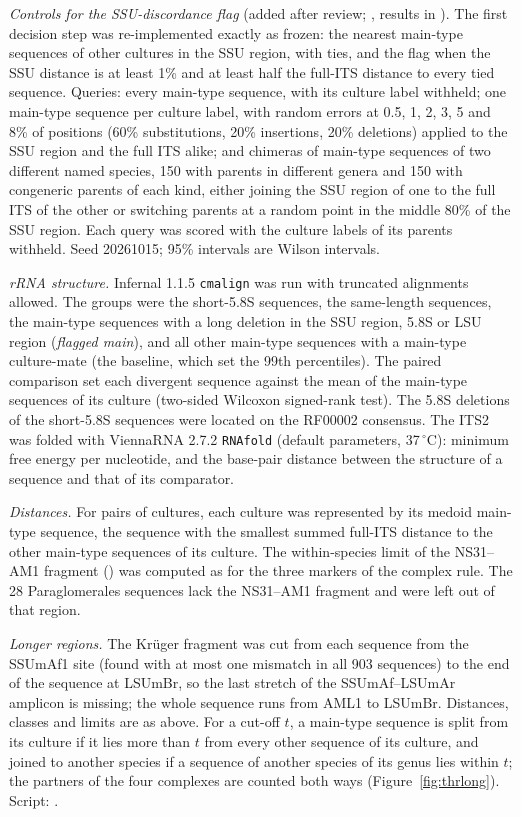 \documentclass[11pt]{article}
\begin{document}
\emph{Controls for the SSU-discordance flag} (added after review; , results in
). The first decision step was re-implemented exactly as frozen: the
nearest main-type sequences of other cultures in the SSU region, with ties, and the flag when the SSU distance is at
least 1\% and at least half the full-ITS distance to every tied sequence. Queries: every main-type sequence, with its
culture label withheld; one main-type sequence per culture label, with random errors at 0.5, 1, 2, 3, 5 and 8\% of
positions (60\% substitutions, 20\% insertions, 20\% deletions) applied to the SSU region and the full ITS alike; and
chimeras of main-type sequences of two different named species, 150 with parents in different genera and 150 with
congeneric parents of each kind, either joining the SSU region of one to the full ITS of the other or switching
parents at a random point in the middle 80\% of the SSU region. Each query was scored with the culture labels of its
parents withheld. Seed 20261015; 95\% intervals are Wilson intervals.

\emph{rRNA structure.} Infernal 1.1.5 \texttt{cmalign} was run with truncated alignments allowed. The groups were the
short-5.8S sequences, the same-length sequences, the main-type sequences with a long deletion in the SSU region, 5.8S
or LSU region (\emph{flagged main}), and all other main-type sequences with a main-type culture-mate (the baseline,
which set the 99th percentiles). The paired comparison set each divergent sequence against the mean of the main-type
sequences of its culture (two-sided Wilcoxon signed-rank test). The 5.8S deletions of the short-5.8S sequences were
located on the RF00002 consensus. The ITS2 was folded with ViennaRNA 2.7.2 \texttt{RNAfold} (default parameters,
37\,$^\circ$C): minimum free energy per nucleotide, and the base-pair distance between the structure of a sequence and
that of its comparator.

\emph{Distances.} For pairs of cultures, each culture was represented by its medoid main-type sequence, the sequence
with the smallest summed full-ITS distance to the other main-type sequences of its culture. The within-species limit
of the NS31--AM1 fragment (\ThrVTSpread{}) was computed as for the three markers of the complex rule. The 28
Paraglomerales sequences lack the NS31--AM1 fragment and were left out of that region.

\emph{Longer regions.} The Kr\"uger fragment was cut from each sequence from the SSUmAf1 site \cite{kruger2009dna}
(found with at most one mismatch in all 903 sequences) to the end of the sequence at LSUmBr, so the last stretch of
the SSUmAf--LSUmAr amplicon is missing; the whole sequence runs from AML1 to LSUmBr. Distances, classes and limits are
as above. For a cut-off $t$, a main-type sequence is split from its culture if it lies more than $t$ from every other
sequence of its culture, and joined to another species if a sequence of another species of its genus lies within
$t$; the partners of the four complexes are counted both ways (Figure~\ref{fig:thrlong}). Script:
.
\end{document}
